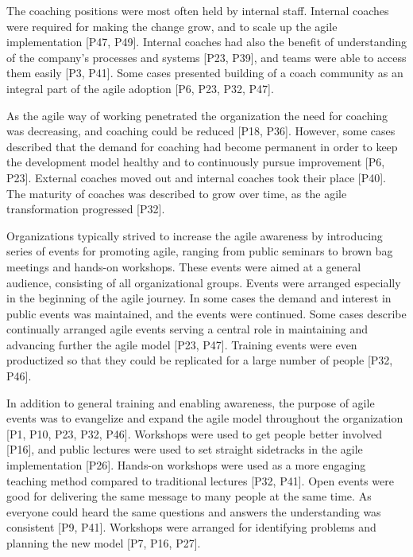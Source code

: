 \documentclass[preprint,authoryear,12pt]{elsarticle}
\begin{document}

The coaching positions were most often held by internal staff.
Internal coaches were required for making the change grow, and to scale up the
agile implementation [P47, P49]. Internal coaches had also the benefit of
understanding of the company's processes and systems [P23, P39], and teams were
able to access them easily [P3, P41]. Some cases presented building of a coach
community as an integral part of the agile adoption [P6, P23, P32, P47].

As the agile way of working penetrated the organization the need for coaching
was decreasing, and coaching could be reduced [P18, P36]. However, some cases
described that the demand for coaching had become permanent in order to keep the
development model healthy and to continuously pursue improvement [P6, P23].
External coaches moved out and internal coaches took their place [P40].
The maturity of coaches was described to grow over time, as the agile
transformation progressed [P32].




Organizations typically strived to increase the agile awareness by introducing
series of events for promoting agile, ranging from public seminars to brown bag
meetings and hands-on workshops. These events were aimed at a general audience,
consisting of all organizational groups. Events were arranged especially in the
beginning of the agile journey. In some cases the demand and interest in public
events was maintained, and the events were continued.
Some cases describe continually arranged agile events serving a central role in
maintaining and advancing further the agile model [P23, P47].
Training events were even productized so that they could be replicated for a
large number of people [P32, P46].

In addition to general training and enabling awareness, the purpose of agile
events was to evangelize and expand the agile model throughout the organization
[P1, P10, P23, P32, P46].
Workshops were used to get people better involved [P16], and public lectures
were used to set straight sidetracks in the agile implementation [P26].
Hands-on workshops were used as a more engaging teaching method compared to
traditional lectures [P32, P41]. Open events were good for delivering the same
message to many people at the same time. As everyone could heard the same
questions and answers the understanding was consistent [P9, P41].
Workshops were arranged for identifying problems and planning the new model [P7,
P16, P27].
\end{document}
